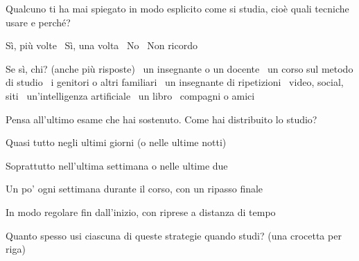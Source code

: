 { Qualcuno ti ha mai spiegato in modo esplicito come si
studia, cioè quali tecniche usare e perché?
\begin{opzioni}
  \item Sì, più volte \quad\quadretto\ Sì, una volta \quad\quadretto\ No
        \quad\quadretto\ Non ricordo
\end{opzioni}
Se sì, chi? (anche più risposte) \quadretto\ un insegnante o un
docente \quadretto\ un corso sul metodo di studio \quadretto\ i
genitori o altri familiari \quadretto\ un insegnante di ripetizioni
\quadretto\ video, social, siti \quadretto\ un'intelligenza
artificiale \quadretto\ un libro \quadretto\ compagni o amici

 Pensa all'ultimo esame che hai sostenuto. Come hai
distribuito lo studio?
\begin{opzioni}
  \item Quasi tutto negli ultimi giorni (o nelle ultime notti)
  \item Soprattutto nell'ultima settimana o nelle ultime due
  \item Un po' ogni settimana durante il corso, con un ripasso finale
  \item In modo regolare fin dall'inizio, con riprese a distanza di
        tempo
\end{opzioni}

 Quanto spesso usi ciascuna di queste strategie quando
studi? (una crocetta per riga)

}
